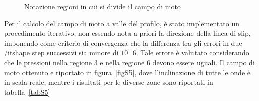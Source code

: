 \begin{figure}[h!]
\caption{\footnotesize Notazione regioni in cui si divide il campo di moto}
\label{figS4}
\end{figure}
 
 Per il calcolo del campo di moto a valle del profilo, è stato implementato un procedimento iterativo, non essendo nota a priori la direzione della linea di slip, imponendo come criterio di convergenza che la differenza tra gli errori in due {/itshape step} successivi sia  minore di $10^-6$. Tale errore è valutato considerando che le pressioni nella regione 3 e nella regione 6 devono essere uguali. Il campo di moto ottenuto e riportato in figura~\vref{figS5}, dove l'inclinazione di tutte le onde è in scala reale, mentre i risultati per le diverse zone sono riportati in tabella~\vref{tabS5}

